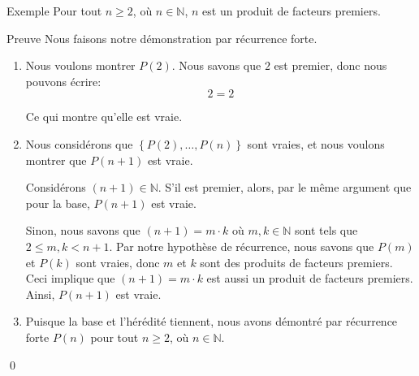 \documentclass[a4paper]{article}
\begin{document}
\begin{parag}{Exemple}
    Pour tout $n \geq 2$, où $n \in \mathbb{N}$, $n$ est un produit de facteurs premiers.

    \begin{subparag}{Preuve}
        Nous faisons notre démonstration par récurrence forte. 
        \begin{enumerate}[left=0pt]
            \item Nous voulons montrer $P\left(2\right)$. Nous savons que $2$ est premier, donc nous pouvons écrire: 
            \[2 = 2\]
            
            Ce qui montre qu'elle est vraie.
        \item Nous considérons que $\left\{P\left(2\right), \ldots, P\left(n\right)\right\}$ sont vraies, et nous voulons montrer que $P\left(n+1\right)$ est vraie. 

            Considérons $\left(n + 1\right) \in \mathbb{N}$. S'il est premier, alors, par le même argument que pour la base, $P\left(n+1\right)$ est vraie.

            Sinon, nous savons que $\left(n + 1\right) = m\cdot k$ où $m, k \in \mathbb{N}$ sont tels que $2 \leq m, k < n + 1$. Par notre hypothèse de récurrence, nous savons que $P\left(m\right)$ et $P\left(k\right)$ sont vraies, donc $m$ et $k$ sont des produits de facteurs premiers. Ceci implique que $\left(n + 1\right) = m\cdot k$ est aussi un produit de facteurs premiers. Ainsi, $P\left(n+1\right)$ est vraie.
        \item Puisque la base et l'hérédité tiennent, nous avons démontré par récurrence forte $P\left(n\right)$ pour tout $n \geq 2$, où $n \in \mathbb{N}$.
        \end{enumerate}
        
        \qed
    \end{subparag}
\end{parag}
\end{document}
